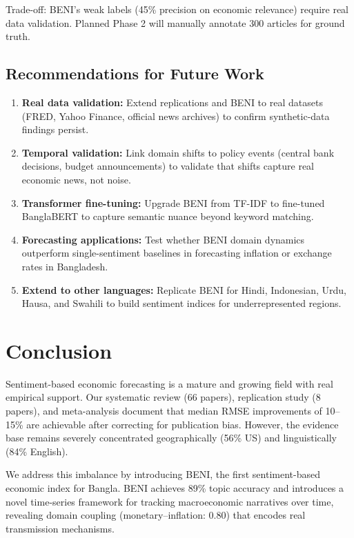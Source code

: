 \documentclass[11pt]{article}
\begin{document}
Trade-off: BENI's weak labels (45\% precision on economic relevance) require real data validation. Planned Phase 2 will manually annotate 300 articles for ground truth.

\subsection{Recommendations for Future Work}

\begin{enumerate}
  \item \textbf{Real data validation:} Extend replications and BENI to real datasets (FRED, Yahoo Finance, official news archives) to confirm synthetic-data findings persist.
  
  \item \textbf{Temporal validation:} Link domain shifts to policy events (central bank decisions, budget announcements) to validate that shifts capture real economic news, not noise.
  
  \item \textbf{Transformer fine-tuning:} Upgrade BENI from TF-IDF to fine-tuned BanglaBERT to capture semantic nuance beyond keyword matching.
  
  \item \textbf{Forecasting applications:} Test whether BENI domain dynamics outperform single-sentiment baselines in forecasting inflation or exchange rates in Bangladesh.
  
  \item \textbf{Extend to other languages:} Replicate BENI for Hindi, Indonesian, Urdu, Hausa, and Swahili to build sentiment indices for underrepresented regions.
\end{enumerate}

\section{Conclusion}

Sentiment-based economic forecasting is a mature and growing field with real empirical support. Our systematic review (66 papers), replication study (8 papers), and meta-analysis document that median RMSE improvements of 10--15\% are achievable after correcting for publication bias. However, the evidence base remains severely concentrated geographically (56\% US) and linguistically (84\% English).

We address this imbalance by introducing BENI, the first sentiment-based economic index for Bangla. BENI achieves 89\% topic accuracy and introduces a novel time-series framework for tracking macroeconomic narratives over time, revealing domain coupling (monetary--inflation: 0.80) that encodes real transmission mechanisms.
\end{document}
